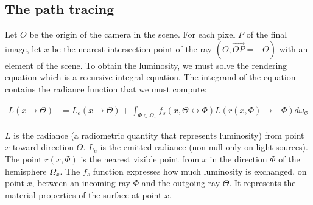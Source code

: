%
%
%
%
%

\subsection{The path tracing}

Let $O$ be the origin of the camera in the scene. For each pixel $P$ of the final image, let $x$ be the nearest intersection point of the ray $(O, \overrightarrow{OP} = -\Theta)$ with an element of the scene. To obtain the luminosity, we must solve the rendering equation \cite{Ka86} which is a recursive integral equation. The integrand of the equation contains the radiance function that we must compute:

\begin{align*}
L(x \rightarrow \Theta) &= L_e(x \rightarrow \Theta) + \int_{\Phi \in \Omega_x} f_s(x, \Theta \leftrightarrow \Phi) L(r(x, \Phi) \rightarrow -\Phi) d\omega_\Phi
\end{align*}

$L$ is the radiance (a radiometric quantity that represents luminosity) from point $x$ toward direction $\Theta$. $L_e$ is the emitted radiance (non null only on light sources). The point $r(x, \Phi)$ is the nearest visible point from $x$ in the direction $\Phi$ of the hemisphere $\Omega_x$. The $f_s$ function expresses how much luminosity is exchanged, on point $x$, between an incoming ray $\Phi$ and the outgoing ray $\Theta$. It represents the material properties of the surface at point $x$.

